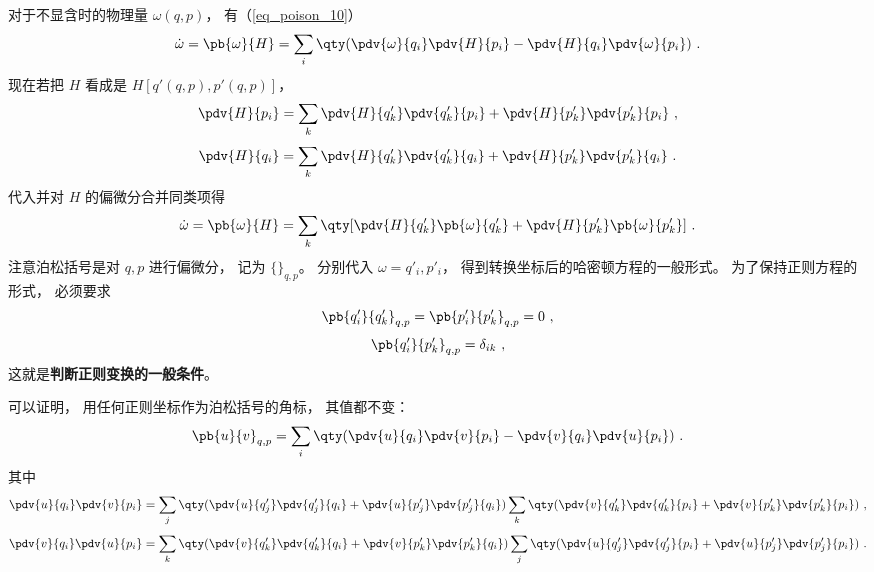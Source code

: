 对于不显含时的物理量 $\omega(q, p)$， 有（\autoref{eq_poison_10}）
\begin{equation}
\dot \omega  = \pb{\omega}{H}  = \sum_i \qty(\pdv{\omega}{q_i}\pdv{H}{p_i} - \pdv{H}{q_i} \pdv{\omega}{p_i})~.
\end{equation}
现在若把 $H$ 看成是 $H[q'(q,p),p'(q,p)]$，  
\begin{equation}
\pdv{H}{p_i} = \sum_k \pdv{H}{q'_k} \pdv{q'_k}{p_i} + \pdv{H}{p'_k} \pdv{p'_k}{p_i}~,
\end{equation}
\begin{equation}
\pdv{H}{q_i} = \sum_k \pdv{H}{q'_k} \pdv{q'_k}{q_i} + \pdv{H}{p'_k} \pdv{p'_k}{q_i}~.
\end{equation}
代入并对 $H$ 的偏微分合并同类项得
\begin{equation}
\dot \omega  = \pb{\omega}{H} = \sum_k \qty[ \pdv{H}{q'_k} \pb{\omega}{q'_k} + \pdv{H}{p'_k} \pb{\omega}{p'_k}]~.
\end{equation}
注意泊松括号是对 $q,p$ 进行偏微分， 记为 $\{ {}\}_{q,p}$。  分别代入 $\omega  = q'_i, p'_i$，  得到转换坐标后的哈密顿方程的一般形式。 为了保持正则方程的形式， 必须要求
\begin{equation}
\pb{q'_i}{q'_k}_{q,p} = \pb{p'_i}{p'_k}_{q,p} = 0~,
\end{equation}
\begin{equation}\label{eq_ClsMec_2}
\pb{q'_i}{p'_k}_{q,p} = \delta_{ik}~,
\end{equation}
这就是\textbf{判断正则变换的一般条件}。

可以证明， 用任何正则坐标作为泊松括号的角标， 其值都不变：
\begin{equation}\label{eq_ClsMec_1}
\pb{u}{v}_{q,p} = \sum_i \qty( \pdv{u}{q_i}\pdv{v}{p_i} - \pdv{v}{q_i}\pdv{u}{p_i} ) ~.
\end{equation}
其中
\begin{equation}
\pdv{u}{q_i} \pdv{v}{p_i} = \sum_j \qty( \pdv{u}{q'_j} \pdv{q'_j}{q_i} + \pdv{u}{p'_j}\pdv{p'_j}{q_i} ) \sum_k \qty(\pdv{v}{q'_k}\pdv{q'_k}{p_i} + \pdv{v}{p'_k}\pdv{p'_k}{p_i}) ~,
\end{equation}
\begin{equation}
\pdv{v}{q_i} \pdv{u}{p_i} = \sum_k \qty( \pdv{v}{q'_k}\pdv{q'_k}{q_i} + \pdv{v}{p'_k}\pdv{p'_k}{q_i} ) \sum_j \qty(\pdv{u}{q'_j}\pdv{q'_j}{p_i} + \pdv{u}{p'_j}\pdv{p'_j}{p_i})~.
\end{equation}
 
